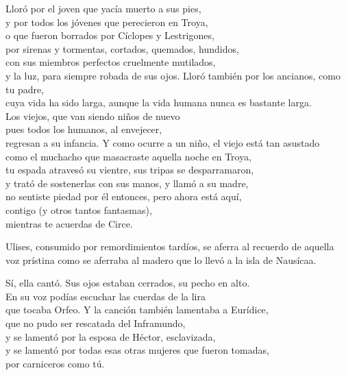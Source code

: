\begin{versopropio}
Lloró por el joven que yacía muerto a sus pies,\\
y por todos los jóvenes que perecieron en Troya,\\
o que fueron borrados por Cíclopes y Lestrigones,\\
por sirenas y tormentas, cortados, quemados, hundidos,\\
con sus miembros perfectos cruelmente mutilados,\\
y la luz, para siempre robada de sus ojos.
\stanzabreak
Lloró también por los ancianos, como tu padre,\\
cuya vida ha sido larga,
\stanzabreak
aunque la vida humana nunca es bastante larga.\\
Los viejos, que van siendo niños de nuevo\\
pues todos los humanos, al envejecer,\\
regresan a su infancia.
\stanzabreak
Y como ocurre a un niño, el viejo está tan asustado\\
como el muchacho que masacraste aquella noche en Troya,\\
tu espada atravesó su vientre, sus tripas se desparramaron,\\
y trató de sostenerlas con sus manos, y llamó a su madre,\\
no sentiste piedad por él entonces, pero ahora está aquí,\\
contigo (y otros tantos fantasmas),\\
mientras te acuerdas de Circe.
\end{versopropio}

Ulises, consumido por remordimientos tardíos, se aferra al recuerdo de aquella voz prístina como se aferraba al madero que lo llevó a la isla de Nausícaa.

\begin{versopropio}
Sí, ella cantó. Sus ojos estaban cerrados, su pecho en alto.\\
En su voz podías escuchar las cuerdas de la lira\\
que tocaba Orfeo. Y la canción también lamentaba a Eurídice,\\
que no pudo ser rescatada del Inframundo,\\
y se lamentó por la esposa de Héctor, esclavizada,\\
y se lamentó por todas esas otras mujeres que fueron tomadas,\\
por carniceros como tú.
\end{versopropio}

